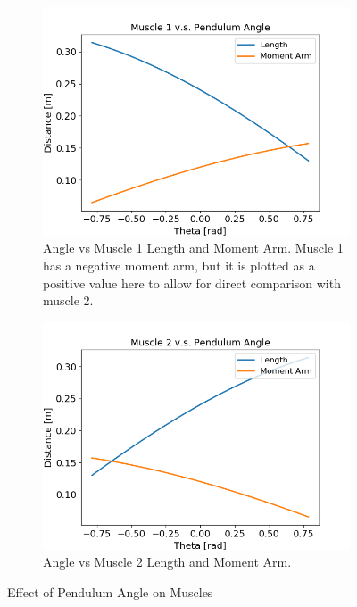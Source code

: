 \documentclass{cmc}
\begin{document}
\begin{figure}[H]
    \centering
    \begin{subfigure}[t]{0.49\textwidth}
        \centering
        \includegraphics[width=\textwidth]{2a/2a_m1.png}
        \caption{Angle vs Muscle 1 Length and Moment Arm. Muscle 1 has a negative moment arm, but it is plotted as a positive value here to allow for direct comparison with muscle 2.}
    \end{subfigure}
    \hfill
    \begin{subfigure}[t]{0.49\textwidth}
        \centering
        \includegraphics[width=\textwidth]{2a/2a_m2.png}
        \caption{Angle vs Muscle 2 Length and Moment Arm.}
        \end{subfigure}
    \caption{Effect of Pendulum Angle on Muscles}
    \label{fig:2a}
\end{figure}
\end{document}

